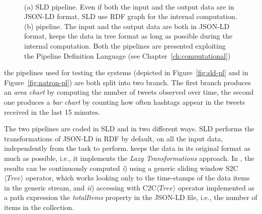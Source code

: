 {\begin{figure}[t]
\centering
{} \\
\caption{(a) SLD pipeline. Even if both the input and the output data are in JSON-LD format, SLD use RDF graph for the internal computation.
(b) \sti{} pipeline. The input and the output data are both in JSON-LD format, \sti{} keeps the data in tree format as long as possible during the internal computation.
Both the pipelines are presented exploiting the Pipeline Definition Language (see Chapter~\ref{ch:computational})}
\end{figure}

the pipelines used for testing the systems (depicted in Figure~\ref{fig:sld-pl} and in Figure~\ref{fig:natron-pl}) are both split into two branch. The first branch produces an \textit{area chart} by computing the number of tweets observed over time, the second one produces a \textit{bar chart} by counting how often hashtags appear in the tweets received in the last 15 minutes.

The two pipelines are coded in SLD and \sti{} in two different ways. 
SLD performs the transformations of JSON-LD in RDF by default, on all the input data, independently from the task to perform. \sti{} keeps the data in its original format as much as possible, i.e., it implements the \textit{Lazy Transformations} approach.
In \sti{}, the results can be continuously computed \textit{i}) using a generic sliding window S2C$\langle Tree \rangle$ operator, which works looking only to the time-stamps of the data items in the generic stream, and \textit{ii}) accessing with C2C$\langle Tree \rangle$ operator implemented as a path expression the \textit{totalItems} property in the JSON-LD file, i.e., the number of items in the collection.

}
